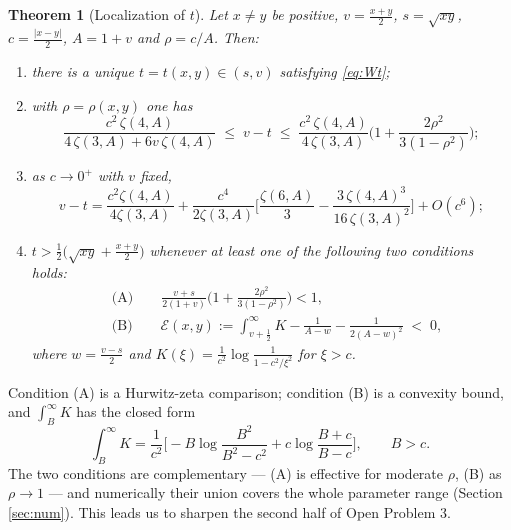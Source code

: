 \documentclass[11pt,a4paper]{amsart}
\newtheorem{theorem}{Theorem}[section]
\theoremstyle{definition}
\begin{document}
\begin{theorem}[Localization of $t$]\label{thm:loc}
Let $x\ne y$ be positive, $v=\tfrac{x+y}{2}$, $s=\sqrt{xy}$, $c=\tfrac{|x-y|}{2}$,
$A=1+v$ and $\rho=c/A$. Then:
\begin{enumerate}
\item[\rm(i)] there is a unique $t=t(x,y)\in(s,v)$ satisfying \eqref{eq:Wt};
\item[\rm(ii)] with $\rho=\rho(x,y)$ one has
  \begin{equation}\label{eq:locbnd}
    \frac{c^{2}\,\zeta(4,A)}{4\,\zeta(3,A)+6v\,\zeta(4,A)}
    \;\le\; v-t \;\le\;
    \frac{c^{2}\,\zeta(4,A)}{4\,\zeta(3,A)}\Big(1+\frac{2\rho^{2}}{3(1-\rho^{2})}\Big);
  \end{equation}
\item[\rm(iii)] as $c\to0^{+}$ with $v$ fixed,
  \begin{equation}\label{eq:locasym}
    v-t=\frac{c^{2}\zeta(4,A)}{4\zeta(3,A)}
     +\frac{c^{4}}{2\zeta(3,A)}\Big[\frac{\zeta(6,A)}{3}
       -\frac{3\,\zeta(4,A)^{3}}{16\,\zeta(3,A)^{2}}\Big]+O(c^{6});
  \end{equation}
\item[\rm(iv)] $t>\frac{1}{2}\big(\sqrt{xy}+\frac{x+y}{2}\big)$ whenever at least one of
  the following two conditions holds:
  \begin{align}
    &\text{(A)}\qquad \frac{v+s}{2(1+v)}\Big(1+\frac{2\rho^{2}}{3(1-\rho^{2})}\Big)<1,
      \label{eq:condA}\\[1mm]
    &\text{(B)}\qquad \mathcal{E}(x,y):=
      \int_{v+\frac12}^{\infty}\!\!K-\frac{1}{A-w}-\frac{1}{2(A-w)^{2}}\;<\;0,
      \label{eq:condB}
  \end{align}
  where $w=\frac{v-s}{2}$ and $K(\xi)=\frac{1}{c^{2}}\log\frac{1}{1-c^{2}/\xi^{2}}$
  for $\xi>c$.
\end{enumerate}
\end{theorem}

Condition (A) is a Hurwitz-zeta comparison; condition (B) is a convexity bound, and
$\int_{B}^{\infty}K$ has the closed form
\begin{equation}\label{eq:intK}
  \int_{B}^{\infty}K=\frac{1}{c^{2}}\Big[-B\log\frac{B^{2}}{B^{2}-c^{2}}
     +c\log\frac{B+c}{B-c}\Big],\qquad B>c .
\end{equation}
The two conditions are complementary --- (A) is effective for moderate $\rho$, (B) as
$\rho\to1$ --- and numerically their union covers the whole parameter range
(Section \ref{sec:num}). This leads us to sharpen the second half of Open Problem 3.
\end{document}
